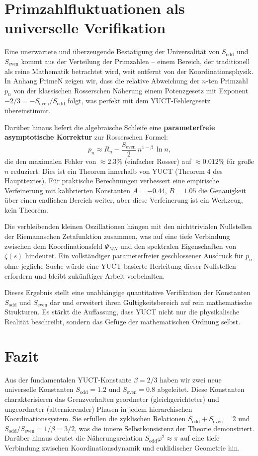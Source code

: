 \documentclass[12pt,a4paper]{article}
\begin{document}
	\section{Primzahlfluktuationen als universelle Verifikation}
	\label{sec:primes}
	
	Eine unerwartete und überzeugende Bestätigung der Universalität von \(S_{\mathrm{odd}}\) und \(S_{\mathrm{even}}\) kommt aus der Verteilung der Primzahlen -- einem Bereich, der traditionell als reine Mathematik betrachtet wird, weit entfernt von der Koordinationsphysik. In Anhang PrimeN zeigen wir, dass die relative Abweichung der \(n\)-ten Primzahl \(p_n\) von der klassischen Rosserschen Näherung einem Potenzgesetz mit Exponent \(-2/3 = -S_{\mathrm{even}}/S_{\mathrm{odd}}\) folgt, was perfekt mit dem YUCT-Fehlergesetz übereinstimmt.
	
	Darüber hinaus liefert die algebraische Schleife eine \textbf{parameterfreie asymptotische Korrektur} zur Rosserschen Formel:
	\[
	p_n \approx R_n - \frac{S_{\mathrm{even}}}{2}\, n^{1-\beta}\,\ln n,
	\]
	die den maximalen Fehler von \(\approx 2.3\%\) (einfacher Rosser) auf \(\approx 0.012\%\) für große \(n\) reduziert. Dies ist ein Theorem innerhalb von YUCT (Theorem 4 des Haupttextes). Für praktische Berechnungen verbessert eine empirische Verfeinerung mit kalibrierten Konstanten \(A=-0.44\), \(B=1.05\) die Genauigkeit über einen endlichen Bereich weiter, aber diese Verfeinerung ist ein Werkzeug, kein Theorem.
	
	Die verbleibenden kleinen Oszillationen hängen mit den nichttrivialen Nullstellen der Riemannschen Zetafunktion zusammen, was auf eine tiefe Verbindung zwischen dem Koordinationsfeld \(\Psi_{MN}\) und den spektralen Eigenschaften von \(\zeta(s)\) hindeutet. Ein vollständiger parameterfreier geschlossener Ausdruck für \(p_n\) ohne jegliche Suche würde eine YUCT-basierte Herleitung dieser Nullstellen erfordern und bleibt zukünftiger Arbeit vorbehalten.
	
	Dieses Ergebnis stellt eine unabhängige quantitative Verifikation der Konstanten \(S_{\mathrm{odd}}\) und \(S_{\mathrm{even}}\) dar und erweitert ihren Gültigkeitsbereich auf rein mathematische Strukturen. Es stärkt die Auffassung, dass YUCT nicht nur die physikalische Realität beschreibt, sondern das Gefüge der mathematischen Ordnung selbst.
	
	\section{Fazit}
	Aus der fundamentalen YUCT-Konstante \(\beta = 2/3\) haben wir zwei neue universelle Konstanten \(S_{\text{odd}} = 1.2\) und \(S_{\text{even}} = 0.8\) abgeleitet. Diese Konstanten charakterisieren das Grenzverhalten geordneter (gleichgerichteter) und ungeordneter (alternierender) Phasen in jedem hierarchischen Koordinationssystem. Sie erfüllen die zyklischen Relationen \(S_{\text{odd}}+S_{\text{even}}=2\) und \(S_{\text{odd}}/S_{\text{even}} = 1/\beta = 3/2\), was die innere Selbstkonsistenz der Theorie demonstriert. Darüber hinaus deutet die Näherungsrelation \(S_{\text{odd}}\varphi^2 \approx \pi\) auf eine tiefe Verbindung zwischen Koordinationsdynamik und euklidischer Geometrie hin.
	
\end{document}

